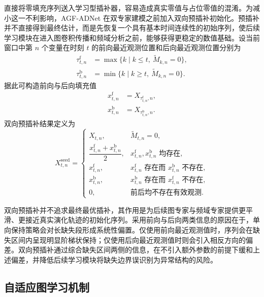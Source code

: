 \documentclass[bachelor, vlined]{DissertUESTC}
\begin{document}
    直接将零填充序列送入学习型插补器，容易造成真实零值与占位零值的混淆。为减小这一不利影响，AGF-ADNet 在双专家建模之前加入双向预插补初始化。预插补并不直接得到最终估计，而是先恢复一个具有基本时间连续性的初始序列，使后续学习模块在进入图卷积传播和频域分析之前，能够获得更稳定的数值基础。设当前窗口中第 $n$ 个变量在时刻 $t$ 的前向最近观测位置和后向最近观测位置分别为
    \begin{align}
        \tau_{t,n}^{\mathrm{f}} &= \max\{k \mid k \leq t,\ \widetilde{M}_{k,n}=0\}, \\
        \tau_{t,n}^{\mathrm{b}} &= \min\{k \mid k \geq t,\ \widetilde{M}_{k,n}=0\}.
    \end{align}
    据此可构造前向与后向填充值
    \begin{align}
        x_{t,n}^{\mathrm{f}} &= X_{\tau_{t,n}^{\mathrm{f}},n}, \\
        x_{t,n}^{\mathrm{b}} &= X_{\tau_{t,n}^{\mathrm{b}},n}.
    \end{align}
    双向预插补结果定义为
    \begin{equation}
        X_{t,n}^{\mathrm{seed}} =
        \begin{cases}
            X_{t,n}, & \widetilde{M}_{t,n}=0, \\
            \dfrac{x_{t,n}^{\mathrm{f}} + x_{t,n}^{\mathrm{b}}}{2}, & x_{t,n}^{\mathrm{f}},x_{t,n}^{\mathrm{b}} \text{ 均存在}, \\
            x_{t,n}^{\mathrm{f}}, & x_{t,n}^{\mathrm{f}} \text{ 存在而 } x_{t,n}^{\mathrm{b}} \text{ 不存在}, \\
            x_{t,n}^{\mathrm{b}}, & x_{t,n}^{\mathrm{b}} \text{ 存在而 } x_{t,n}^{\mathrm{f}} \text{ 不存在}, \\
            0, & \text{前后均不存在有效观测}.
        \end{cases}
    \end{equation}
    
    双向预插补并不追求最终最优插补，其作用是为后续图专家与频域专家提供更平滑、更接近真实演化轨迹的初始化序列。采用前向与后向两类信息的原因在于，单向保持策略会对长缺失段形成系统性偏置。仅使用前向最近观测值时，序列会在缺失区间内呈现明显阶梯状保持；仅使用后向最近观测值时则会引入相反方向的偏差。双向预插补通过综合缺失区间两侧的信息，在不引入额外参数的前提下缓和上述偏差，并降低后续学习模块将缺失边界误识别为异常结构的风险。
    
    \subsection{自适应图学习机制}
    
\end{document}
